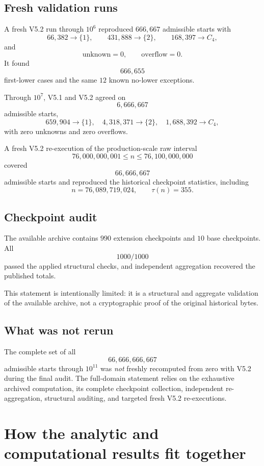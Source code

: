 \documentclass[11pt]{article}
\theoremstyle{definition}
\theoremstyle{remark}
\begin{document}
\subsection{Fresh validation runs}

A fresh V5.2 run through $10^6$ reproduced $666,667$ admissible starts with
\[
66,382\to\{1\},\qquad
431,888\to\{2\},\qquad
168,397\to C_4,
\]
and
\[
\text{unknown}=0,\qquad
\text{overflow}=0.
\]
It found
\[
666,655
\]
first-lower cases and the same $12$ known no-lower exceptions.

Through $10^7$, V5.1 and V5.2 agreed on
\[
6,666,667
\]
admissible starts,
\[
659,904\to\{1\},\quad
4,318,371\to\{2\},\quad
1,688,392\to C_4,
\]
with zero unknowns and zero overflows.

A fresh V5.2 re-execution of the production-scale raw interval
\[
76,000,000,001\le n\le76,100,000,000
\]
covered
\[
66,666,667
\]
admissible starts and reproduced the historical checkpoint statistics, including
\[
n=76,089,719,024,\qquad\tau(n)=355.
\]

\subsection{Checkpoint audit}

The available archive contains $990$ extension checkpoints and $10$ base checkpoints.  All
\[
\boxed{1000/1000}
\]
passed the applied structural checks, and independent aggregation recovered the published totals.

This statement is intentionally limited: it is a structural and aggregate validation of the available archive, not a cryptographic proof of the original historical bytes.

\subsection{What was not rerun}

The complete set of all
\[
66,666,666,667
\]
admissible starts through $10^{11}$ was \emph{not} freshly recomputed from zero with V5.2 during the final audit.  The full-domain statement relies on the exhaustive archived computation, its complete checkpoint collection, independent re-aggregation, structural auditing, and targeted fresh V5.2 re-executions.

\section{How the analytic and computational results fit together}
\end{document}
